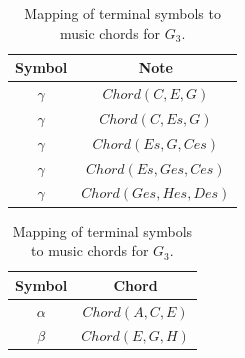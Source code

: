 \begin{table}[h]
\centering
\begin{minipage}{0.48\textwidth}
\centering
\begin{tabular}{c|c}
Symbol & Note \\
\hline
$\gamma$ & $Chord(C,E,G)$ \\
$\gamma$ & $Chord(C,Es,G)$ \\
$\gamma$ & $Chord(Es,G,Ces)$ \\
$\gamma$ & $Chord(Es,Ges,Ces)$ \\
$\gamma$ & $Chord(Ges,Hes,Des)$ \\
\end{tabular}
\caption{Mapping of terminal symbols to chords from the Tonnetz walk using PR transformations of $G_2$.}
\label{Tb4}
\end{minipage}
\hfill
\begin{minipage}{0.48\textwidth}
\centering
\begin{tabular}{c|c}
Symbol & Chord \\
\hline
$\alpha$ & $Chord(A,C,E)$ \\
$\beta$ & $Chord(E,G,H)$ \\
\end{tabular}
\caption{Mapping of terminal symbols to music chords for $G_3$.}
\label{Tb5}
\end{minipage}
\end{table}

